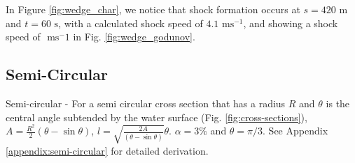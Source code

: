 \documentclass[12pt]{article}
\begin{document}
In Figure \ref{fig:wedge_char}, we notice that shock formation occurs at $s= 420\text{ m}$ and $t= 60\text{ s}$, with a calculated shock speed of $ 4.1\text{ ms}^{-1}$, and showing a shock speed of $ \text{ ms}^-1$ in Fig. \ref{fig:wedge_godunov}.

\subsection{Semi-Circular}
Semi-circular - For a semi circular cross section that has a radius $R$ and $\theta$ is the central angle subtended by the water surface (Fig. \ref{fig:cross-sections}), $A = \frac{R^2}{2}\left(\theta - \sin\theta\right)$, $l = \sqrt{\frac{2A}{\left(\theta - \sin\theta\right)}}\theta$. $\alpha = 3\%$ and $\theta = \pi/3$. See Appendix \ref{appendix:semi-circular} for detailed derivation.
\end{document}
